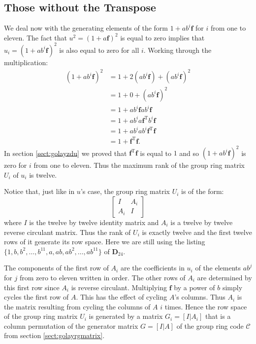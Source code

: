 \subsection{Those without the Transpose}
\label{sect:withouttranspose}
We deal now with the generating elements of the form $1 + a b^i \mathbf{f}$ for $i$ from one to eleven.
The fact that $u^2 = (1+a \mathbf{f})^2$ is equal to zero implies that $u_i = (1+ a b^i \mathbf{f})^2$ is also equal to zero for all $i$.
Working through the multiplication:
\begin{align*}
(1+ a b^i \mathbf{f})^2 
&= 1 + 2 ( a b^i \mathbf{f} ) + ( a b^i \mathbf{f})^2 \\
&= 1 + 0 + ( a b^i \mathbf{f})^2 \\
&= 1 +  a b^i \mathbf{f} a b^i \mathbf{f} \\
&= 1 +  a b^i a \mathbf{f}^{\textrm{T}} b^i \mathbf{f} \\
&= 1 +  a b^i a b^i \mathbf{f}^{\textrm{T}} \mathbf{f} \\
&= 1 +  \mathbf{f}^{\textrm{T}} \mathbf{f}.
\end{align*}
In section \ref{sect:golayzdu} we proved that $\mathbf{f}^{\textrm{T}} \mathbf{f}$ is equal to $1$ and so $(1 + a b^i \mathbf{f})^2$ is zero for $i$ from one to eleven.
Thus the maximum rank of the group ring matrix $U_i$ of $u_i$ is twelve.

Notice that, just like in $u$'s case, the group ring matrix $U_i$ is of the form:
\[\left[ \begin{array}{c|c}
I & A_i \\
\hline
A_i & I
\end{array} \right] \]
where $I$ is the twelve by twelve identity matrix and $A_i$ is a twelve by twelve reverse circulant matrix.
Thus the rank of $U_i$ is exactly twelve and the first twelve rows of it generate its row space.
Here we are still using the listing $\{ 1 , b , b^2 , \ldots , b^{11}  , a , ab , ab^2 , \ldots , ab^{11} \}$ of $\mathbf{D}_{24}$.

The components of the first row of $A_i$ are the coefficients in $u_i$ of the elements $ab^j$ for $j$ from zero to eleven written in order.
The other rows of $A_i$ are determined by this first row since $A_i$ is reverse circulant.
Multiplying $\mathbf{f}$ by a power of $b$ simply cycles the first row of $A$.
This has the effect of cycling $A$'s columns.
Thus $A_i$ is the matrix resulting from cycling the columns of $A$ $i$ times.
Hence the row space of the group ring matrix $U_i$ is generated by a matrix $G_i = [I|A_i]$ that is a column permutation of the generator matrix $G = [I|A]$ of the group ring code $\mathcal{C}$ from section \ref{sect:golayrgmatrix}.

